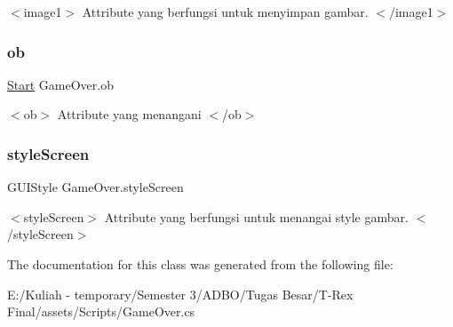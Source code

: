 $<$image1$>$ Attribute yang berfungsi untuk menyimpan gambar. $<$/image1$>$ \hypertarget{class_game_over_a02e1491bad9373330f05c667aa6eca9d}{}\label{class_game_over_a02e1491bad9373330f05c667aa6eca9d} 
\subsubsection{\texorpdfstring{ob}{ob}}
{\footnotesize\ttfamily \hyperlink{class_start}{Start} Game\+Over.\+ob}

$<$ob$>$ Attribute yang menangani $<$/ob$>$ \hypertarget{class_game_over_a038383b18f14cf294618f4f66f919a1d}{}\label{class_game_over_a038383b18f14cf294618f4f66f919a1d} 
\subsubsection{\texorpdfstring{style\+Screen}{styleScreen}}
{\footnotesize\ttfamily G\+U\+I\+Style Game\+Over.\+style\+Screen}

$<$style\+Screen$>$ Attribute yang berfungsi untuk menangai style gambar. $<$/style\+Screen$>$ 

The documentation for this class was generated from the following file\+:\begin{DoxyCompactItemize}
\item 
E\+:/\+Kuliah -\/ temporary/\+Semester 3/\+A\+D\+B\+O/\+Tugas Besar/\+T-\/\+Rex Final/assets/\+Scripts/Game\+Over.\+cs\end{DoxyCompactItemize}
